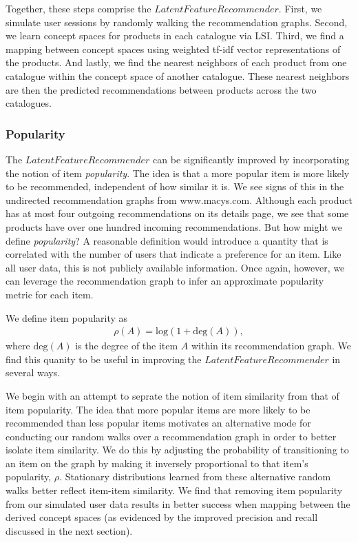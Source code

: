\documentclass[11pt]{article}
\begin{document}
Together, these steps comprise the $LatentFeatureRecommender$. First, we
simulate user sessions by randomly walking the recommendation graphs. Second, we
learn concept spaces for products in each catalogue via LSI. Third, we find a
mapping between concept spaces using weighted tf-idf vector representations of
the products. And lastly, we find the nearest neighbors of each product from one
catalogue within the concept space of another catalogue. These nearest neighbors
are then the predicted recommendations between products across the two
catalogues.

\subsubsection*{Popularity}
The $LatentFeatureRecommender$ can be significantly improved by incorporating
the notion of item {\em popularity}. The idea is that a more popular item is
more likely to be recommended, independent of how similar it is. We see signs of
this in the undirected recommendation graphs from www.macys.com. Although each
product has at most four outgoing recommendations on its details page, we see
that some products have over one hundred incoming recommendations. But how
might we define {\em popularity}? A reasonable definition would introduce a
quantity that is correlated with the number of users that indicate a preference
for an item. Like all user data, this is not publicly available information.
Once again, however, we can leverage the recommendation graph to infer an
approximate popularity metric for each item.

We define item popularity as
\begin{align}
\rho(A) = \mathrm{log}(1 + \mathrm{deg}(A)),
\end{align}
where $\mathrm{deg}(A)$ is the degree of the item $A$ within its recommendation
graph.  We find this quanity to be useful in improving the
$LatentFeatureRecommender$ in several ways.

We begin with an attempt to seprate the notion of item similarity from that of
item popularity. The idea that more popular items are more likely to be
recommended than less popular items motivates an alternative mode for conducting
our random walks over a recommendation graph in order to better isolate item
similarity. We do this by adjusting the probability of transitioning to an item
on the graph by making it inversely proportional to that item's popularity,
$\rho$. Stationary distributions learned from these alternative random walks
better reflect item-item similarity. We find that removing item popularity from
our simulated user data results in better success when mapping between the
derived concept spaces (as evidenced by the improved precision and recall
discussed in the next section).
\end{document}
